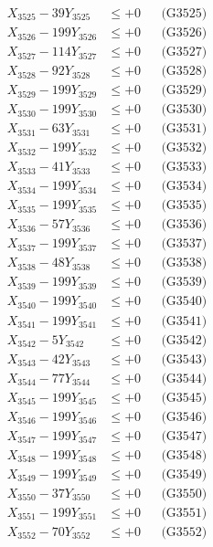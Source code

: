 \documentclass[a4paper,10pt]{article}
\begin{document}
{\begin{align}
X_{3525} - 39Y_{3525} &\leq +0 && \text{(G3525)} \\
X_{3526} - 199Y_{3526} &\leq +0 && \text{(G3526)} \\
X_{3527} - 114Y_{3527} &\leq +0 && \text{(G3527)} \\
X_{3528} - 92Y_{3528} &\leq +0 && \text{(G3528)} \\
X_{3529} - 199Y_{3529} &\leq +0 && \text{(G3529)} \\
X_{3530} - 199Y_{3530} &\leq +0 && \text{(G3530)} \\
\allowbreak
X_{3531} - 63Y_{3531} &\leq +0 && \text{(G3531)} \\
X_{3532} - 199Y_{3532} &\leq +0 && \text{(G3532)} \\
X_{3533} - 41Y_{3533} &\leq +0 && \text{(G3533)} \\
X_{3534} - 199Y_{3534} &\leq +0 && \text{(G3534)} \\
X_{3535} - 199Y_{3535} &\leq +0 && \text{(G3535)} \\
X_{3536} - 57Y_{3536} &\leq +0 && \text{(G3536)} \\
X_{3537} - 199Y_{3537} &\leq +0 && \text{(G3537)} \\
X_{3538} - 48Y_{3538} &\leq +0 && \text{(G3538)} \\
X_{3539} - 199Y_{3539} &\leq +0 && \text{(G3539)} \\
X_{3540} - 199Y_{3540} &\leq +0 && \text{(G3540)} \\
\allowbreak
X_{3541} - 199Y_{3541} &\leq +0 && \text{(G3541)} \\
X_{3542} - 5Y_{3542} &\leq +0 && \text{(G3542)} \\
X_{3543} - 42Y_{3543} &\leq +0 && \text{(G3543)} \\
X_{3544} - 77Y_{3544} &\leq +0 && \text{(G3544)} \\
X_{3545} - 199Y_{3545} &\leq +0 && \text{(G3545)} \\
X_{3546} - 199Y_{3546} &\leq +0 && \text{(G3546)} \\
X_{3547} - 199Y_{3547} &\leq +0 && \text{(G3547)} \\
X_{3548} - 199Y_{3548} &\leq +0 && \text{(G3548)} \\
X_{3549} - 199Y_{3549} &\leq +0 && \text{(G3549)} \\
X_{3550} - 37Y_{3550} &\leq +0 && \text{(G3550)} \\
\allowbreak
X_{3551} - 199Y_{3551} &\leq +0 && \text{(G3551)} \\
X_{3552} - 70Y_{3552} &\leq +0 && \text{(G3552)} \\

\end{align}}
\end{document}
